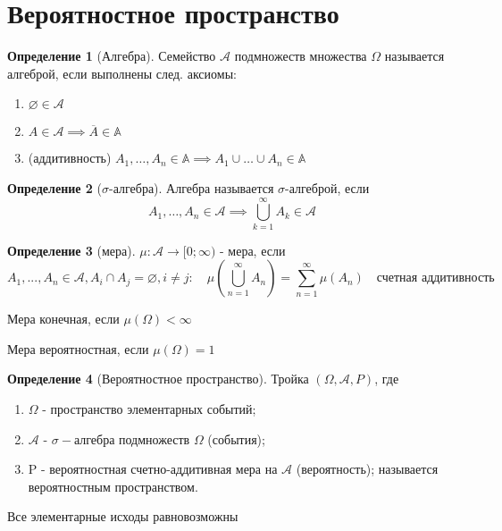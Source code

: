 \documentclass[a4paper]{article}
\theoremstyle{definition}
\newtheorem*{definition}{Определение}
\theoremstyle{remark}
\begin{document}
\tableofcontents
\section{Вероятностное пространство}

\begin{definition}[Алгебра]
    Семейство $\mathcal{A}$ подмножеств множества $\Omega$ называется
    алгеброй, если выполнены след. аксиомы:
    \begin{enumerate}
        \item $\varnothing \in \mathcal{A}$
        \item $A\in\mathcal{A} \implies \overline{A}\in \mathbb{A}$
        \item (аддитивность) $A_1, \dots, A_n \in \mathbb{A} \implies A_1 \cup \dots \cup A_n\in \mathbb{A}$ 
    \end{enumerate}
\end{definition}
\begin{definition}[$\sigma$-алгебра]
    Алгебра называется $\sigma$-алгеброй, если 
    \[A_1, \dots, A_n \in \mathcal{A} \implies \bigcup\limits_{k = 1}^\infty  A_k \in \mathcal{A}\]
\end{definition}
\begin{definition}[мера]
    $\mu: \mathcal {A} \to [0; \infty)$ - мера, если 
    \[A_1, ..., A_n \in \mathcal{A}, A_i\cap A_j = \varnothing, i\neq j: \quad \mu(\bigcup\limits_{n = 1}^\infty  A_n) = \sum\limits_{n = 1}^\infty \mu (A_n)\quad \text{счетная аддитивность}\]

    Мера конечная, если $\mu(\Omega) < \infty$

    Мера вероятностная, если $\mu (\Omega) = 1$
\end{definition}
\begin{definition}[Вероятностное пространство]
    Тройка $(\Omega, \mathcal{A}, P)$, где 
    \begin{enumerate}
        \item $\Omega$ - пространство элементарных событий;
        \item $\mathcal{A}$ - $\sigma-$алгебра подмножеств $\Omega$ (события);
        \item P - вероятностная счетно-аддитивная мера на $\mathcal{A}$ (вероятность);
        называется вероятностным пространством.
    \end{enumerate}
\end{definition}
Все элементарные исходы равновозможны
\end{document}

